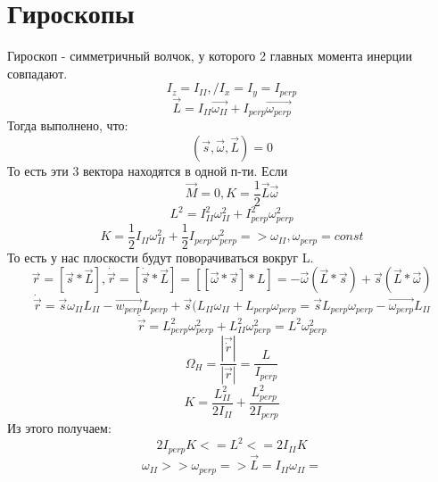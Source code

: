 \section{Гироскопы}
Гироскоп - симметричный волчок, у которого 2 главных момента инерции совпадают.
\[I_z = I_{II}, / I_x = I_y = I_{perp}\]
\[\Vec{L} = I_{II}\Vec{\omega_{II}} + I_{perp}\Vec{\omega_{perp}}\]
Тогда выполнено, что:
\[(\Vec{s}, \Vec{\omega}, \Vec{L}) = 0\]
То есть эти 3 вектора находятся в одной п-ти.
Если
\[\Vec{M} = 0, K = \frac{1}{2}\Vec{L}\Vec{\omega}\]
\[L^2 = I_{II}^2\omega_{II}^2 + I_{perp}^2\omega_{perp}^2\]
\[K = \frac{1}{2}I_{II}\omega_{II}^2 + \frac{1}{2}I_{perp}\omega_{perp}^2 => \omega_{II}, \omega_{perp} = const\]
То есть у нас плоскости будут поворачиваться вокруг L.
\[\Vec{r} = [\Vec{s} * \Vec{L}], \dot \Vec{r} = [\dot \Vec{s} * \Vec{L}] = [[\Vec{\omega} * \Vec{s}] * L] = -\Vec{\omega}(\Vec{L} * \Vec{s}) + \Vec{s} (\Vec{L} * \Vec{\omega})\]
\[\dot \Vec{r} = \Vec{s}\omega_{II}L_{II} - \Vec{w_{perp}}L_{perp} + \Vec{s}(L_{II}\omega_{II} + L_{perp}\omega_{perp} = \Vec{s}L_{perp}\omega_{perp} - \Vec{\omega_{perp}}L_{II}\]
\[\dot \Vec{r} = L_{perp}^2\omega_{perp}^2 + L_{II}^2\omega_{perp}^2 = L^2 \omega_{perp}^2\]
\[\Omega_{H} = \frac{|\Vec{\dot{r}}|}{|\Vec{r}|} = \frac{L}{I_{perp}}\]
\[K = \frac{L_{II}^2}{2I_{II}} + \frac{L_{perp}^2}{2I_{perp}}\]
Из этого получаем:
\[2I_{perp}K <= L^2 <= 2I_{II}K\]
\[\omega_{II} >> \omega_{perp} => \Vec{L} = I_{II}\omega_{II} = \]